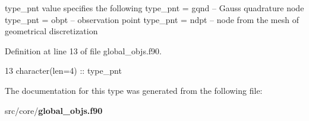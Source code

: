 type\+\_\+pnt value specifies the following type\+\_\+pnt = gqnd -- Gauss quadrature node type\+\_\+pnt = obpt -- observation point type\+\_\+pnt = ndpt -- node from the mesh of geometrical discretization 



Definition at line 13 of file global\+\_\+objs.\+f90.


\begin{DoxyCode}
13     \textcolor{keywordtype}{character(len=4)} :: type\_pnt
\end{DoxyCode}


The documentation for this type was generated from the following file\+:\begin{DoxyCompactItemize}
\item 
src/core/{\bf global\+\_\+objs.\+f90}\end{DoxyCompactItemize}
